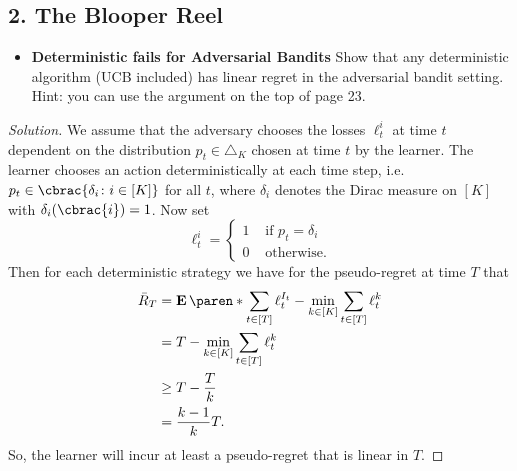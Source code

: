 \documentclass[10pt, a4paper, twoside]{amsart}
\theoremstyle{plain}
\DeclarePairedDelimiter\cbrac\{\}
\DeclarePairedDelimiter\paren()
\renewcommand{\c}{\ensuremath{\colon}}
\newcommand{\Ev}{\operatorname*{\ensuremath{\mathbf{E}}}} %
\newenvironment{solution}
               {\let\oldqedsymbol=\qedsymbol
                \renewcommand{\qedsymbol}{$\blacktriangleleft$}
                \begin{proof}[Solution]}
               {\end{proof}
                \renewcommand{\qedsymbol}{\oldqedsymbol}}
\begin{document}
\subsection*{2. The Blooper Reel}
\begin{itemize}
    \item \textbf{Deterministic fails for Adversarial Bandits} Show that any deterministic algorithm (UCB included) has linear regret in the adversarial bandit setting. Hint: you can use the argument on the top of page 23.
\end{itemize}  
\begin{solution}
We assume that the adversary chooses the losses $\ell_{t}^{i}$ at time $t$ dependent on the distribution $p_t \in \triangle_K$ chosen at time $t$ by the learner. The learner chooses an action deterministically at each time step, 
i.e. $p_t \in \cbrac{\delta_i \c i \in [K]}$ for all $t$, 
where $\delta_i$ denotes the Dirac measure on $[K]$ with $\delta_i(\cbrac{i})=1$.
Now set
\begin{equation*}
 \ell_{t}^{i}=
 \begin{cases}
  1 & \text{ if }p_t=\delta_i \\
  0 & \text{ otherwise}.
 \end{cases}
\end{equation*}
Then for each deterministic strategy we have for the pseudo-regret at time $T$ that 
\begin{align*}
 \bar{R}_T &= \Ev\paren*{\sum_{t \in [T]} \ell_{t}^{I_t}}-\min_{k \in [K]}\sum_{t \in [T]}\ell_{t}^{k} \\
 &= T-\min_{k \in [K]}\sum_{t \in [T]}\ell_{t}^{k} \\
 &\geq T-\frac{T}{k} \\
 &= \frac{k-1}{k}T.
\end{align*}
So, the learner will incur at least a pseudo-regret that is linear in $T$.
\end{solution}
\end{document}

